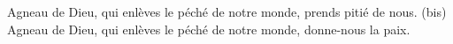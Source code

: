 Agneau de Dieu, qui enlèves le péché de notre monde, prends pitié de nous. (bis)\\
Agneau de Dieu, qui enlèves le péché de notre monde, donne-nous la paix.
